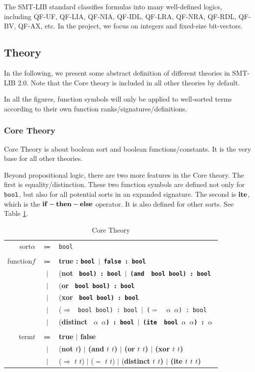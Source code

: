 \documentclass[10pt,letter]{article}
\theoremstyle{definition}
\begin{document}
The SMT-LIB standard classifies formulas into many well-defined logics, including QF-UF, QF-LIA, QF-NIA, QF-IDL, QF-LRA, QF-NRA, QF-RDL, QF-BV, QF-AX, etc. In the project, we focus on integers and fixed-size bit-vectors.

\subsection{Theory}
In the following, we present some abstract definition of different theories in SMT-LIB 2.0. Note that the Core theory is included in all other theories by default.

In all the figures, function symbols will only be applied to well-sorted terms according to their own function ranks/signatures/definitions.


\subsubsection{Core Theory}
Core Theory is about boolean sort and boolean functions/constants. It is the very base for all other theories.

Beyond propositional logic, there are two more features in the Core theory. The first is equality/distinction. These two function symbols are defined not only for $\tt bool$, but also for all potential sorts in an expanded signature. The second is $\bf ite$, which is the $\bf if-then-else$ operator. It is also defined for other sorts. See Table \ref{t:coretheory}.


\begin{table}[!h]
\begin{mdframed}
\centering
\begin{tabular}{r c l}
sort\qquad $\alpha$ & $\Coloneqq$ & \tt bool\\
\\
function\qquad $f$ & $\Coloneqq$ & \bf true \rm : \tt bool $\mid$ \bf false \rm : \tt bool \\
& $\mid$ & (\bf not \tt\ bool\rm) : \tt bool $\mid$ \rm(\bf and \tt\ bool bool\rm) : \tt bool \\
& $\mid$ & (\bf or \tt\ bool bool\rm) : \tt bool \\
& $\mid$ & (\bf xor \tt\ bool bool\rm) : \tt bool \\
& $\mid$ & ($\Rightarrow$ \tt\ bool bool\rm) : \tt bool $\mid$ \rm($=$ \tt\ $\alpha$ $\alpha$\rm) : \tt bool\\
& $\mid$ & (\bf distinct \tt\ $\alpha$ $\alpha$\rm) : \tt bool $\mid$ \rm(\bf ite \tt\ bool $\alpha$ $\alpha$\rm) : $\alpha$\\
\\
term\qquad $t$ & $\Coloneqq$ & \bf true $\mid$ false\\
& $\mid$ & (\bf not \rm $t$) $\mid$ (\bf and \rm $t$ $t$) $\mid$ (\bf or \rm $t$ $t$) $\mid$ (\bf xor \rm $t$ $t$) \\
& $\mid$ & ($\Rightarrow$ $t$ $t$) $\mid$ ($=$ $t$ $t$) $\mid$ (\bf distinct \rm $t$ $t$) $\mid$ (\bf ite \rm $t$ $t$ $t$)\\
\end{tabular}
\end{mdframed}
\caption{Core Theory}
\label{t:coretheory}
\end{table}
\end{document}
